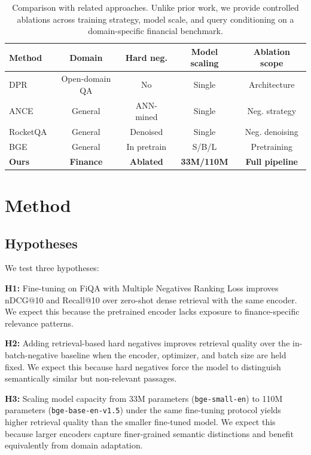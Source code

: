 \documentclass{article} %
\begin{document}
\begin{table}[t]
    \centering
    \scriptsize
    \begin{tabular}{lcccc}
        \toprule
        Method & Domain & Hard neg. & Model scaling & Ablation scope \\
        \midrule
        DPR \citep{karpukhin2020dense} & Open-domain QA & No & Single & Architecture \\
        ANCE \citep{xiong2020approximate} & General & ANN-mined & Single & Neg. strategy \\
        RocketQA \citep{qu2021rocketqa} & General & Denoised & Single & Neg. denoising \\
        BGE \citep{xiao2023cpack,flagembedding2023} & General & In pretrain & S/B/L & Pretraining \\
        \textbf{Ours} & \textbf{Finance} & \textbf{Ablated} & \textbf{33M/110M} & \textbf{Full pipeline} \\
        \bottomrule
    \end{tabular}
    \caption{Comparison with related approaches. Unlike prior work, we provide controlled ablations across training strategy, model scale, and query conditioning on a domain-specific financial benchmark.}
    \label{tab:positioning}
\end{table}

\section{Method}

\subsection{Hypotheses}

We test three hypotheses:

\textbf{H1:} Fine-tuning on FiQA with Multiple Negatives Ranking Loss improves nDCG@10 and Recall@10 over zero-shot dense retrieval with the same encoder. We expect this because the pretrained encoder lacks exposure to finance-specific relevance patterns.

\textbf{H2:} Adding retrieval-based hard negatives improves retrieval quality over the in-batch-negative baseline when the encoder, optimizer, and batch size are held fixed. We expect this because hard negatives force the model to distinguish semantically similar but non-relevant passages.

\textbf{H3:} Scaling model capacity from 33M parameters (\texttt{bge-small-en}) to 110M parameters (\texttt{bge-base-en-v1.5}) under the same fine-tuning protocol yields higher retrieval quality than the smaller fine-tuned model. We expect this because larger encoders capture finer-grained semantic distinctions and benefit equivalently from domain adaptation.
\end{document}
